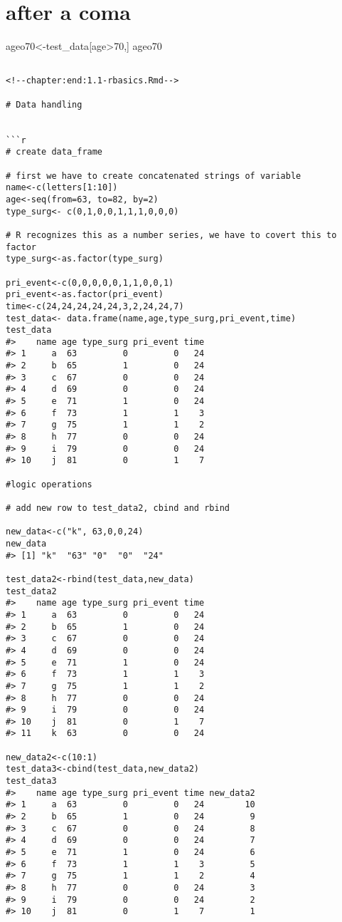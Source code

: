 \documentclass[
]{article}
\begin{document}
\hypertarget{after-a-coma}{%
\section{after a coma}\label{after-a-coma}}

ageo70\textless-test\_data{[}age\textgreater70,{]}
ageo70

\begin{verbatim}

<!--chapter:end:1.1-rbasics.Rmd-->

# Data handling


```r
# create data_frame

# first we have to create concatenated strings of variable
name<-c(letters[1:10])
age<-seq(from=63, to=82, by=2)
type_surg<- c(0,1,0,0,1,1,1,0,0,0)

# R recognizes this as a number series, we have to covert this to factor
type_surg<-as.factor(type_surg)

pri_event<-c(0,0,0,0,0,1,1,0,0,1)
pri_event<-as.factor(pri_event)
time<-c(24,24,24,24,24,3,2,24,24,7)
test_data<- data.frame(name,age,type_surg,pri_event,time)
test_data
#>    name age type_surg pri_event time
#> 1     a  63         0         0   24
#> 2     b  65         1         0   24
#> 3     c  67         0         0   24
#> 4     d  69         0         0   24
#> 5     e  71         1         0   24
#> 6     f  73         1         1    3
#> 7     g  75         1         1    2
#> 8     h  77         0         0   24
#> 9     i  79         0         0   24
#> 10    j  81         0         1    7

#logic operations

# add new row to test_data2, cbind and rbind

new_data<-c("k", 63,0,0,24)
new_data
#> [1] "k"  "63" "0"  "0"  "24"

test_data2<-rbind(test_data,new_data)
test_data2
#>    name age type_surg pri_event time
#> 1     a  63         0         0   24
#> 2     b  65         1         0   24
#> 3     c  67         0         0   24
#> 4     d  69         0         0   24
#> 5     e  71         1         0   24
#> 6     f  73         1         1    3
#> 7     g  75         1         1    2
#> 8     h  77         0         0   24
#> 9     i  79         0         0   24
#> 10    j  81         0         1    7
#> 11    k  63         0         0   24

new_data2<-c(10:1)
test_data3<-cbind(test_data,new_data2)
test_data3
#>    name age type_surg pri_event time new_data2
#> 1     a  63         0         0   24        10
#> 2     b  65         1         0   24         9
#> 3     c  67         0         0   24         8
#> 4     d  69         0         0   24         7
#> 5     e  71         1         0   24         6
#> 6     f  73         1         1    3         5
#> 7     g  75         1         1    2         4
#> 8     h  77         0         0   24         3
#> 9     i  79         0         0   24         2
#> 10    j  81         0         1    7         1


\end{verbatim}
\end{document}
